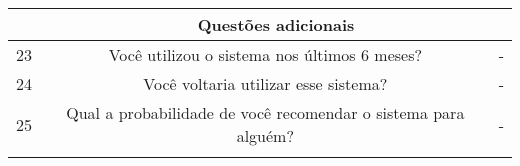 \begin{anexosenv}
\begin{table}[]
{\begin{tabular}{ccc}
\rowcolor[HTML]{C0C0C0} 
\multicolumn{1}{|c|}{\cellcolor[HTML]{C0C0C0}} & \multicolumn{2}{c|}{\cellcolor[HTML]{C0C0C0}Questões adicionais} \\ \hline
\multicolumn{1}{|c|}{23} & \multicolumn{1}{c|}{Você utilizou o sistema nos últimos 6 meses?} & \multicolumn{1}{c|}{-} \\ \hline
\multicolumn{1}{|c|}{24} & \multicolumn{1}{c|}{Você voltaria utilizar esse sistema?} & \multicolumn{1}{c|}{-} \\ \hline
\multicolumn{1}{|c|}{25} & \multicolumn{1}{c|}{Qual a probabilidade de você recomendar o sistema para alguém?} & \multicolumn{1}{c|}{-} \\ \hline
\multicolumn{1}{l}{} & \multicolumn{1}{l}{} & \multicolumn{1}{l}{}
\end{tabular}
}
\end{table}


\end{anexosenv}
